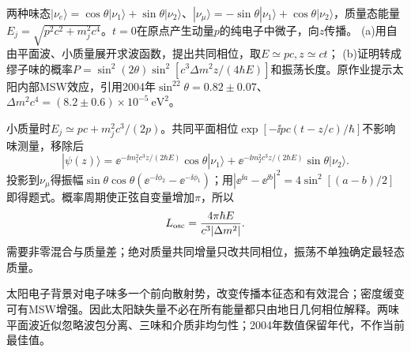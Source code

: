 \begin{exercise}
两种味态$|\nu_e\rangle=\cos\theta|\nu_1\rangle+\sin\theta|\nu_2\rangle$、$|\nu_\mu\rangle=-\sin\theta|\nu_1\rangle+\cos\theta|\nu_2\rangle$，质量态能量$E_j=\sqrt{p^2c^2+m_j^2c^4}$。$t=0$在原点产生动量$p$的纯电子中微子，向$z$传播。
(a)用自由平面波、小质量展开求波函数，提出共同相位，取$E\simeq pc,z\simeq ct$；
(b)证明转成缪子味的概率$P=\sin^2(2\theta)\sin^2[c^3\Delta m^2z/(4\hbar E)]$和振荡长度。原作业提示太阳内部MSW效应，引用2004年$\sin^22\theta=0.82\pm0.07$、$\Delta m^2c^4=(8.2\pm0.6)\times10^{-5}\ \mathrm{eV^2}$。
\end{exercise}
\begin{solution}
小质量时$E_j\simeq pc+m_j^2c^3/(2p)$。共同平面相位$\exp[-\ii pc(t-z/c)/\hbar]$不影响味测量，移除后
\[
 |\psi(z)\rangle=\ee^{-\ii m_1^2c^3z/(2\hbar E)}\cos\theta|\nu_1\rangle
 +\ee^{-\ii m_2^2c^3z/(2\hbar E)}\sin\theta|\nu_2\rangle.
\]
投影到$\nu_\mu$得振幅$\sin\theta\cos\theta(\ee^{-\ii\phi_2}-\ee^{-\ii\phi_1})$；用$|\ee^{\ii a}-\ee^{\ii b}|^2=4\sin^2[(a-b)/2]$即得题式。概率周期使正弦自变量增加$\pi$，所以
\[
 L_{\rm osc}=\frac{4\pi\hbar E}{c^3|\Delta m^2|}.
\]
需要非零混合与质量差；绝对质量共同增量只改共同相位，振荡不单独确定最轻态质量。

太阳电子背景对电子味多一个前向散射势，改变传播本征态和有效混合；密度缓变可有MSW增强。因此太阳缺失量不必在所有能量都只由地日几何相位解释。两味平面波近似忽略波包分离、三味和介质非均匀性；2004年数值保留年代，不作当前最佳值。
\end{solution}
